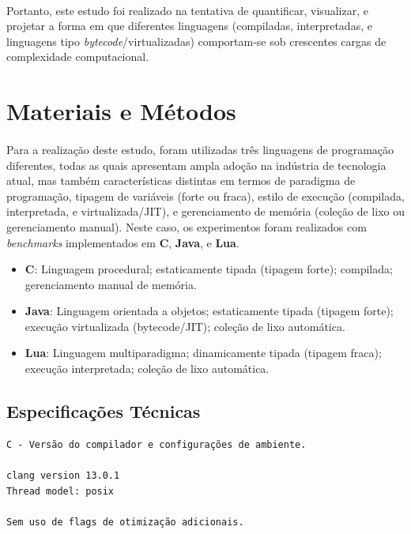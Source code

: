 \documentclass[11pt]{article}
\begin{document}
\paragraph{}
Portanto, este estudo foi realizado na tentativa de quantificar, visualizar, e
projetar a forma em que diferentes linguagens (compiladas, interpretadas, e
linguagens tipo \textit{bytecode}/virtualizadas) comportam-se sob crescentes
cargas de complexidade computacional.

\newpage
\section{Materiais e Métodos}
\paragraph{}
Para a realização deste estudo, foram utilizadas três linguagens de programação
diferentes, todas as quais apresentam ampla adoção na indústria de tecnologia
atual\cite{cass20152015}, mas também características distintas em termos de
paradigma de programação, tipagem de variáveis (forte ou fraca), estilo de
execução (compilada, interpretada, e virtualizada/JIT), e gerenciamento de
memória (coleção de lixo ou gerenciamento manual). Neste caso, os experimentos
foram realizados com \textit{benchmarks} implementados em \textbf{C},
\textbf{Java}, e \textbf{Lua}.

\begin{itemize}
    \item \textbf{C}: Linguagem procedural; estaticamente tipada 
        (tipagem forte); compilada; gerenciamento manual de memória.
    \item \textbf{Java}: Linguagem orientada a objetos; estaticamente tipada
        (tipagem forte); execução virtualizada (bytecode/JIT); coleção de
        lixo automática.
    \item \textbf{Lua}: Linguagem multiparadigma; dinamicamente tipada
        (tipagem fraca); execução interpretada; coleção de lixo automática.
\end{itemize}

\subsection{Especificações Técnicas}

\begin{verbatim}
C - Versão do compilador e configurações de ambiente.

clang version 13.0.1
Thread model: posix

Sem uso de flags de otimização adicionais.
\end{verbatim}
\end{document}
